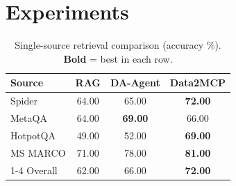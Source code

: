 \section{Experiments}

\begin{table}[t]
  \centering
  \caption{Single-source retrieval comparison (accuracy \%). \textbf{Bold} = best in each row.}
  \label{tab:multisource_single}
  {\setlength{\tabcolsep}{4pt}
  \begin{tabular}{lccc}
    \toprule
    \textbf{Source} & \textbf{RAG} & \textbf{DA-Agent} & \textbf{Data2MCP} \\
    \midrule
    Spider   & 64.00 & 65.00 & \textbf{72.00} \\
    MetaQA   & 64.00 & \textbf{69.00} & 66.00 \\
    HotpotQA & 49.00 & 52.00 & \textbf{69.00} \\
    MS MARCO & 71.00 & 78.00 & \textbf{81.00} \\
    \cmidrule{1-4}
    Overall  & 62.00 & 66.00 & \textbf{72.00} \\
    \bottomrule
  \end{tabular}
  }
\end{table}

